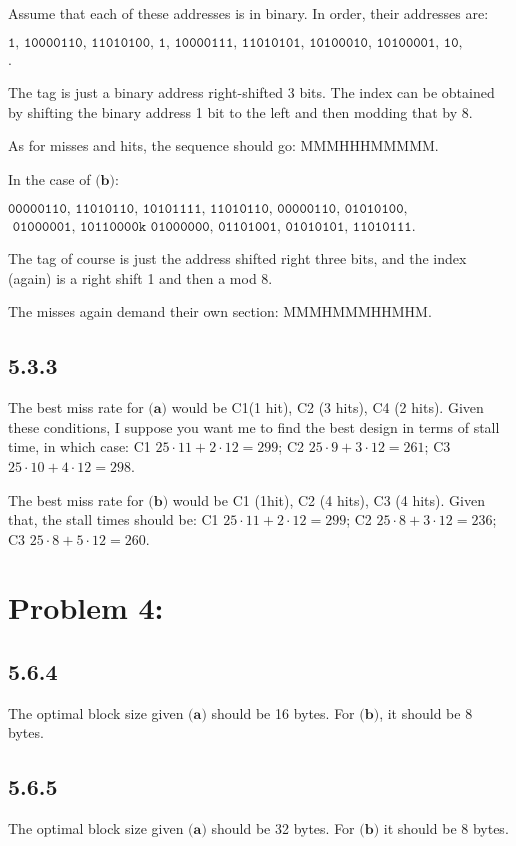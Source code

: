 \documentclass[a4paper]{article}
\begin{document}
Assume that each of these addresses is in binary. In order, their addresses are:

$\texttt{1, 10000110, 11010100, 1, 10000111, 11010101, 10100010, 10100001, 10, 101100, 101001, 11011101}$.

The tag is just a binary address right-shifted 3 bits. The index can be obtained by shifting the binary address 1 bit to the left and then modding that by 8.

As for misses and hits, the sequence should go: MMMHHHMMMMM.

In the case of $\textbf{(b)}$:

$\texttt{00000110, 11010110, 10101111, 11010110, 00000110,  01010100,}$ \\ $\texttt{ 01000001, 10110000k 01000000, 01101001, 01010101, 11010111}$.

The tag of course is just the address shifted right three bits, and the index (again) is a right shift 1 and then a mod 8.

The misses again demand their own section: MMMHMMMHHMHM.

\subsection*{5.3.3} The best miss rate for $\textbf{(a)}$ would be C1(1 hit), C2 (3 hits), C4 (2 hits). Given these conditions, I suppose you want me to find the best design in terms of stall time, in which case: C1 $25 \cdot 11 + 2 \cdot 12 = 299$; C2 $25 \cdot 9 + 3 \cdot 12 = 261$; C3 $25 \cdot 10 + 4 \cdot 12 = 298$.

The best miss rate for $\textbf{(b)}$ would be C1 (1hit), C2 (4 hits), C3 (4 hits). Given that, the stall times should be: C1 $25 \cdot 11 + 2 \cdot 12 = 299$; C2 $25 \cdot 8 + 3 \cdot 12 = 236$; C3 $25 \cdot 8 + 5 \cdot 12 = 260$.

\section*{Problem 4:}

\subsection*{5.6.4} The optimal block size given $\textbf{(a)}$ should be 16 bytes. For $\textbf{(b)}$, it should be 8 bytes.

\subsection*{5.6.5} The optimal block size given $\textbf{(a)}$ should be 32 bytes. For $\textbf{(b)}$ it should be 8 bytes.
\end{document}
